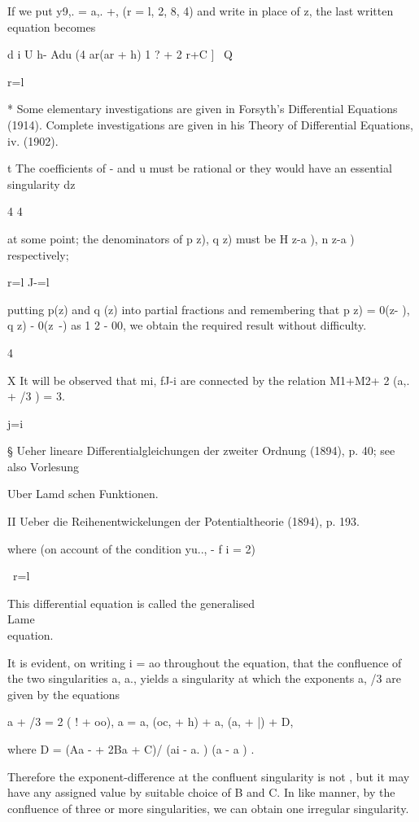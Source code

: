 If we put y9,. = a,. +, (r = l, 2, 8, 4) and write in place of z, the
last written equation becomes

d i U h- Adu (4 ar(ar + h) 1 ? + 2 r+C ] \ Q

r=l

* Some elementary investigations are given in Forsyth's Differential
Equations (1914). Complete investigations are given in his Theory of
Differential Equations, iv. (1902).

t The coefficients of - and u must be rational or they would have an
essential singularity dz

4 4

at some point; the denominators of p z), q z) must be H z-a ), n z-a )
respectively;

r=l J-=l

putting p(z) and q (z) into partial fractions and remembering that p
z) = 0(z- ), q z) - 0(z~-) as 1 2 - 00, we obtain the required result
without difficulty.

4

X It will be observed that mi, fJ-i are connected by the relation
M1+M2+ 2 (a,. + /3 ) = 3.

j=i

§ Ueher lineare Differentialgleichungen der zweiter Ordnung (1894), p.
40; see also Vorlesung

Uber Lamd schen Funktionen.

II Ueber die Reihenentwickelungen der Potentialtheorie (1894), p. 193.

%
%

where (on account of the condition yu.., - f i = 2)

\ r=l

This differential equation is called the generalised \\Lame\\ equation.

It is evident, on writing i = ao throughout the equation, that the
confluence of the two singularities a, a., yields a singularity at
which the exponents a, /3 are given by the equations

a + /3 = 2 ( ! + oo), a = a, (oc, + h) + a, (a, + |) + D,

where D = (Aa - + 2Ba + C)/ (ai - a. ) (a - a ) .

Therefore the exponent-difference at the confluent singularity is not
, but it may have any assigned value by suitable choice of B and C. In
like manner, by the confluence of three or more singularities, we can
obtain one irregular singularity.

